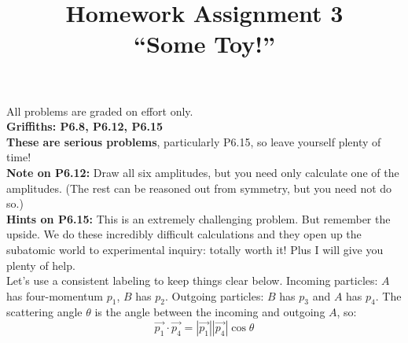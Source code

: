 \documentclass[12pt]{article}
\begin{document}
\newcommand{\ihbar}{\ensuremath{i \hbar}}
\newcommand{\dPsidt}{\ensuremath{ \frac{\partial \Psi}{\partial t} }}
\newcommand{\dPsidx}{\ensuremath{ \frac{\partial \Psi}{\partial x} }}
\newcommand{\ddPsidx}{\ensuremath{ \frac{\partial^2 \Psi}{\partial x^2} }}
\newcommand{\dPssdt}{\ensuremath{ \frac{\partial \Psi^*}{\partial t} }}
\newcommand{\dPssdx}{\ensuremath{ \frac{\partial \Psi^*}{\partial x} }}
\newcommand{\ddPssdx}{\ensuremath{ \frac{\partial^2 \Psi^*}{\partial x^2} }}

\newcommand{\dphidt}{\ensuremath{ \frac{d \phi}{dt} }}
\newcommand{\dpsidx}{\ensuremath{ \frac{d \psi}{dx} }}
\newcommand{\ddpsidx}{\ensuremath{ \frac{d^2 \psi}{dx^2} }}


\date{\vspace{-5ex}}

\title{Homework Assignment 3 \\ ``Some Toy!''}

\maketitle

\noindent
All problems are graded on effort only.\\

\noindent
{\bf Griffiths: P6.8, P6.12, P6.15}\\[5pt]

\noindent
{\bf These are serious problems}, particularly P6.15, so leave yourself plenty
of time!\\[5pt] 

\noindent
{\bf Note on P6.12:} Draw all six amplitudes, but you need only calculate one of the amplitudes.  (The rest can be reasoned out from symmetry, but you need not do so.)\\[5pt]

\noindent
{\bf Hints on P6.15:} This is an extremely challenging problem.  But remember the upside. We do these incredibly difficult calculations and they open up the subatomic world to experimental inquiry: totally worth it!  Plus I will give you plenty of help.\\[5pt]

\noindent
Let's use a consistent labeling to keep things clear below.  Incoming particles: $A$ has four-momentum $p_1$, $B$ has $p_2$.  Outgoing particles: $B$ has $p_3$ and $A$ has $p_4$.  The scattering angle $\theta$ is the angle between the incoming and outgoing $A$, so:
$$\vec{p_1} \cdot \vec{p_4} = |\vec{p_1}| |\vec{p_4}| \cos\theta$$\\
\end{document}
